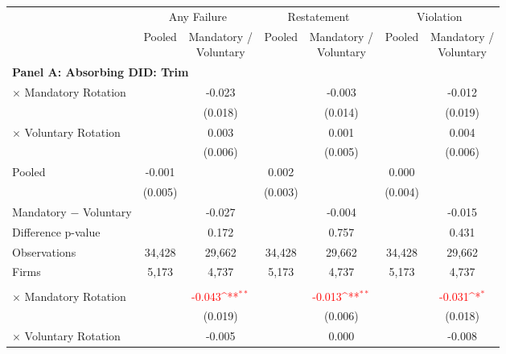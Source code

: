 \documentclass[10pt]{article}
\newcommand{\sym}[1]{\textsuperscript{#1}}
\begin{document}
\begin{minipage}{19cm}\fontsize{10}{12}\selectfont\setlength{\tabcolsep}{4pt}\renewcommand{\arraystretch}{1.12}


\def\sym#1{\ifmmode^{#1}\else\(^{#1}\)\fi}
\centering
{}
\label{tab:absorbing-transition-school-985-or-211-upgrade-no-auditfirm-fe}
\begin{threeparttable}

\begin{tabular}{l cc cc cc}
\toprule
 & \multicolumn{2}{c}{Any Failure} & \multicolumn{2}{c}{Restatement} & \multicolumn{2}{c}{Violation} \\
\cmidrule(lr){2-3}\cmidrule(lr){4-5}\cmidrule(lr){6-7}
 & Pooled & \shortstack{Mandatory /\\Voluntary} & Pooled & \shortstack{Mandatory /\\Voluntary} & Pooled & \shortstack{Mandatory /\\Voluntary} \\
\midrule
\multicolumn{7}{l}{\textbf{Panel A: Absorbing DID: Trim}} \\
$\times$ Mandatory Rotation &  & -0.023 &  & -0.003 &  & -0.012 \\
 &  & (0.018) &  & (0.014) &  & (0.019) \\
$\times$ Voluntary Rotation &  & 0.003 &  & 0.001 &  & 0.004 \\
 &  & (0.006) &  & (0.005) &  & (0.006) \\
Pooled & -0.001 &  & 0.002 &  & 0.000 &  \\
 & (0.005) &  & (0.003) &  & (0.004) &  \\
Mandatory $-$ Voluntary &  & -0.027 &  & -0.004 &  & -0.015 \\
Difference p-value &  & 0.172 &  & 0.757 &  & 0.431 \\
Observations & 34,428 & 29,662 & 34,428 & 29,662 & 34,428 & 29,662 \\
Firms & 5,173 & 4,737 & 5,173 & 4,737 & 5,173 & 4,737 \\
\addlinespace
\multicolumn{7}{l}{\textbf{Panel B: Absorbing DID: Strict}} \\
$\times$ Mandatory Rotation &  & \textcolor{red}{-0.043\sym{**}} &  & \textcolor{red}{-0.013\sym{**}} &  & \textcolor{red}{-0.031\sym{*}} \\
 &  & (0.019) &  & (0.006) &  & (0.018) \\
$\times$ Voluntary Rotation &  & -0.005 &  & 0.000 &  & -0.008 \\

\end{tabular}
\end{threeparttable}
\end{minipage}
\end{document}

